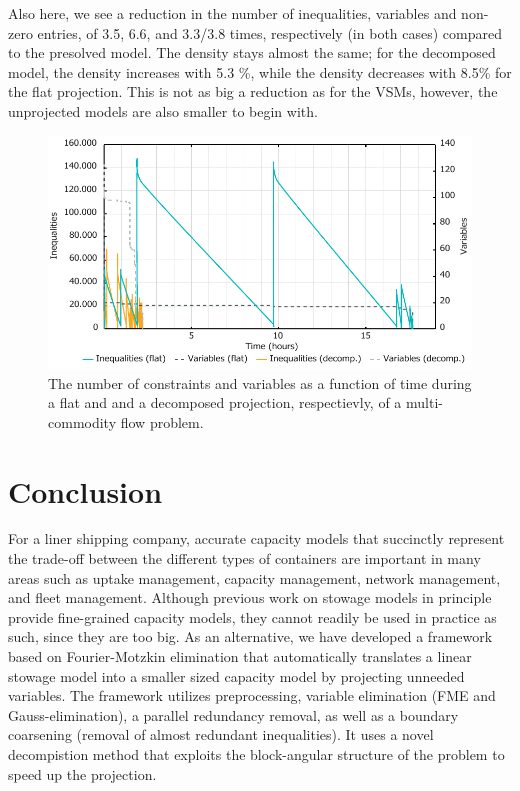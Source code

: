 Also here, we see a reduction in the number of inequalities, variables and non-zero entries, of 3.5, 6.6, and 3.3/3.8 times, respectively (in both cases) compared to the presolved model. The density stays almost the same; for the decomposed model, the density increases with 5.3 \%, while the density decreases with 8.5\% for the flat projection.
This is not as big a reduction as for the VSMs, however, the unprojected models are also smaller to begin with. 

\begin{figure}
	\centering
		\includegraphics[scale=0.7]{figures/multicomGraph2.pdf}
	\caption{The number of constraints and variables as a function of time during a flat and and a decomposed projection, respectievly, of a multi-commodity flow problem.}
	\label{fig:multicom}
\end{figure}

\section{Conclusion}\label{sec:concl}
For a liner shipping company, accurate capacity models that succinctly represent the trade-off between the different types of containers are important in many areas such as uptake management, capacity management, network management, and fleet management. Although previous work on stowage models in principle provide fine-grained capacity models, they cannot readily be used in practice as such, since they are too big.
As an alternative, we have developed a framework based on Fourier-Motzkin elimination that automatically translates a linear stowage model into a smaller sized capacity model by projecting unneeded variables. The framework utilizes preprocessing, variable elimination (FME and Gauss-elimination), a parallel redundancy removal, as well as a boundary coarsening (removal of almost redundant inequalities). It uses a novel decompistion method that exploits the block-angular structure of the problem to speed up the projection.

